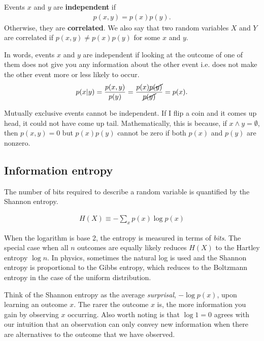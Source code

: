 \begin{definition}
	Events $x$ and $y$ are {\bf independent} if 
	\begin{align}
		p(x,y) = p(x)p(y).
	\end{align}
	Otherwise, they are {\bf correlated}. We also say that two random variables $X$ and $Y$ are correlated if $p(x,y) \neq p(x)p(y)$ for some $x$ and $y$.
\end{definition}
\noindent In words, events $x$ and $y$ are independent if looking at the outcome of one of them does not give you any information about the other event i.e. does not make the other event more or less likely to occur.
\begin{align}
	p(x|y) = \frac{p(x,y)}{p(y)} = \frac{p(x)\cancel{p(y)}}{\cancel{p(y)}} = p(x).
\end{align}

\begin{mybox}
Mutually exclusive events cannot be independent. If I flip a coin and it comes up head, it could not have come up tail. Mathematically, this is because, if $x\wedge y =\emptyset$, then $p(x,y)=0$ but $p(x)p(y)$ cannot be zero if both $p(x)$ and $p(y)$ are nonzero.
\end{mybox}

\subsection{Information entropy}

The number of bits required to describe a random variable is quantified by the Shannon entropy.
\begin{definition}\leavevmode
	\begin{align}
		H(X) \equiv -\sum_x p(x) \log p(x)
	\end{align} 
\end{definition}
\noindent When the logarithm is base 2, the entropy is measured in terms of \emph{bits}. The special case when all $n$ outcomes are equally likely reduces $H(X)$ to the Hartley entropy $\log n$. In physics, sometimes the natural log is used and the Shannon entropy is proportional to the Gibbs entropy, which reduces to the Boltzmann entropy in the case of the uniform distribution.

Think of the Shannon entropy as the average \emph{surprisal}, $-\log p(x)$, upon learning an outcome $x$. The rarer the outcome $x$ is, the more information you gain by observing $x$ occurring. Also worth noting is that $\log 1 = 0$ agrees with our intuition that an observation can only convey new information when there are alternatives to the outcome that we have observed.


